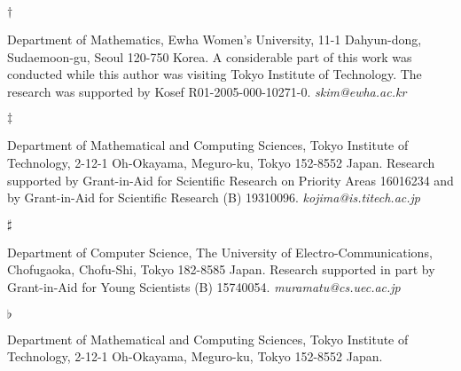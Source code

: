 \medskip

\noindent
\parbox[t]{0.5cm}{$\dagger$}
\parbox[t]{14.9cm}{Department of Mathematics, Ewha Women's University,
11-1 Dahyun-dong, Sudaemoon-gu, Seoul 120-750 Korea.
A considerable part of this work was conducted
while this author was visiting Tokyo Institute of Technology.
 The research was supported
by Kosef R01-2005-000-10271-0.
{\it skim@ewha.ac.kr}
}

\medskip

\noindent
\parbox[t]{0.5cm}{$\ddagger$}
\parbox[t]{14.9cm}{Department of Mathematical and Computing Sciences,
                      Tokyo Institute of Technology,
                      2-12-1 Oh-Okayama, Meguro-ku, Tokyo 152-8552 Japan.
                      Research supported by Grant-in-Aid for
                      Scientific Research on Priority Areas 16016234 and by Grant-in-Aid for
                      Scientific Research (B) 19310096.
{\it kojima@is.titech.ac.jp}
}


\medskip

\noindent
\parbox[t]{0.5cm}{$\sharp$}
\parbox[t]{14.9cm}{Department of  Computer Science, The University of
		Electro-Communications, Chofugaoka, Chofu-Shi, Tokyo
                      182-8585 Japan.
                      Research supported in part 
	by Grant-in-Aid for Young Scientists (B) 15740054.
                      {\it muramatu@cs.uec.ac.jp}
}

\medskip

\noindent
\parbox[t]{0.5cm}{$\flat$}
\parbox[t]{14.9cm}{Department of Mathematical and Computing Sciences,
                      Tokyo Institute of Technology,
                      2-12-1 Oh-Okayama, Meguro-ku, Tokyo 152-8552 Japan.
}

\newpage
